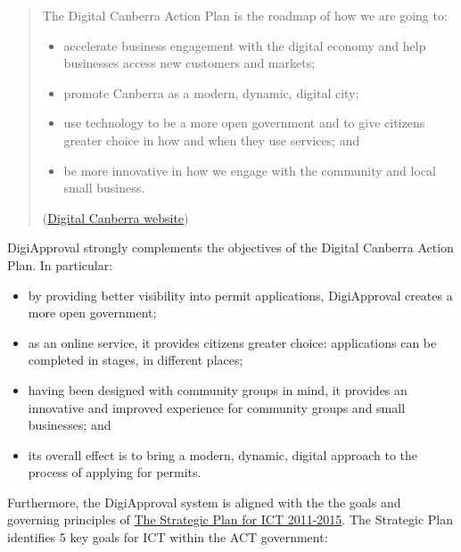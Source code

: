 \documentclass[12pt,a4paper,twosided]{article}
\begin{document}
\begin{framed}
\begin{quote}
The Digital Canberra Action Plan is the roadmap of how we are going to:

\begin{itemize}

\item
  accelerate business engagement with the digital economy and help
  businesses access new customers and markets;
\item
  promote Canberra as a modern, dynamic, digital city;
\item
  use technology to be a more open government and to give citizens
  greater choice in how and when they use services; and
\item
  be more innovative in how we engage with the community and local small
  business.
\end{itemize}

(\href{http://www.cmd.act.gov.au/policystrategic/digitalcanberra}{Digital
Canberra website})
\end{quote}
\end{framed}

DigiApproval strongly complements the objectives of the Digital Canberra
Action Plan. In particular:

\begin{itemize}

\item
  by providing better visibility into permit applications, DigiApproval
  creates a more open government;
\item
  as an online service, it provides citizens greater choice:
  applications can be completed in stages, in different places;
\item
  having been designed with community groups in mind, it provides an
  innovative and improved experience for community groups and small
  businesses; and
\item
  its overall effect is to bring a modern, dynamic, digital approach to
  the process of applying for permits.
\end{itemize}

Furthermore, the DigiApproval system is aligned with the the goals and
governing principles of
\href{http://www.cmd.act.gov.au/__data/assets/pdf_file/0011/247826/The_Strategic_Plan_for_ICT_2011-15.pdf}{The
Strategic Plan for ICT 2011-2015}. The Strategic Plan identifies 5 key
goals for ICT within the ACT government:
\end{document}
